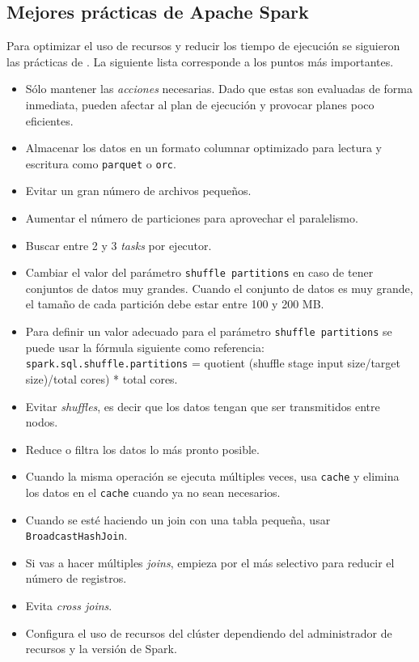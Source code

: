 \subsection{Mejores prácticas de Apache Spark}

Para optimizar el uso de recursos y reducir los tiempo de ejecución se siguieron las prácticas de \cite{sparkibm}. La siguiente lista corresponde a los puntos más importantes.

\begin{itemize}
	\item Sólo mantener las \textit{acciones} necesarias. Dado que estas son evaluadas de forma inmediata, pueden afectar al plan de ejecución y provocar planes poco eficientes.
	\item Almacenar los datos en un formato columnar optimizado para lectura y escritura como \texttt{parquet} o \texttt{orc}.
	\item Evitar un gran número de archivos pequeños.
	\item Aumentar el número de particiones para aprovechar el paralelismo.
	\item Buscar entre 2 y 3 \textit{tasks} por ejecutor.
	\item Cambiar el valor del parámetro \texttt{shuffle partitions} en caso de tener conjuntos de datos muy grandes. Cuando el conjunto de datos es muy grande, el tamaño de cada partición debe estar entre 100 y 200 MB. 
	\item Para definir un valor adecuado para el parámetro \texttt{shuffle partitions} se puede usar la fórmula siguiente como referencia: \texttt{spark.sql.shuffle.partitions} = quotient (shuffle stage input size/target size)/total cores) * total cores.
	\item Evitar \textit{shuffles}, es decir que los datos tengan que ser transmitidos entre nodos.
	\item Reduce o filtra los datos lo más pronto posible.
	\item Cuando la misma operación se ejecuta múltiples veces, usa \texttt{cache} y elimina los datos en el \texttt{cache} cuando ya no sean necesarios.
	\item Cuando se esté haciendo un join con una tabla pequeña, usar \texttt{BroadcastHashJoin}.
	\item Si vas a hacer múltiples \textit{joins}, empieza por el más selectivo para reducir el número de registros.
	\item Evita \textit{cross joins}.
	\item Configura el uso de recursos del clúster dependiendo del administrador de recursos y la versión de Spark.

\end{itemize}
